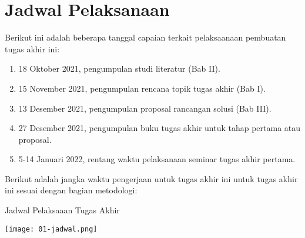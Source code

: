\section{Jadwal Pelaksanaan}

Berikut ini adalah beberapa tanggal capaian terkait pelaksaanaan pembuatan tugas akhir ini:

\begin{enumerate}
  \item 18 Oktober 2021, pengumpulan studi literatur (Bab II).
  \item 15 November 2021, pengumpulan rencana topik tugas akhir (Bab I).
  \item 13 Desember 2021, pengumpulan proposal rancangan solusi (Bab III).
  \item 27 Desember 2021, pengumpulan buku tugas akhir untuk tahap pertama atau proposal.
  \item 5-14 Januari 2022, rentang waktu pelaksanaan seminar tugas akhir pertama.
\end{enumerate}

Berikut adalah jangka waktu pengerjaan untuk tugas akhir ini untuk tugas akhir ini sesuai dengan bagian metodologi:

\begin{table}[ht]
  \centering
  \caption{Jadwal Pelaksaaan Tugas Akhir}
  \texttt{[image: 01-jadwal.png]}
\end{table}


    

